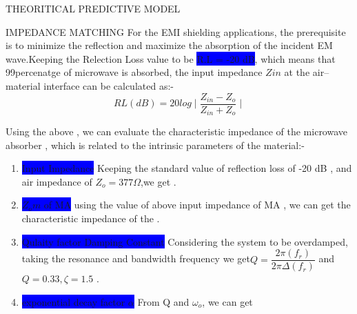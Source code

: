 \documentclass[11pt,aspect ratio=169]{beamer}
\begin{document}
\begin{frame}[t,allowframebreaks]{THEORITICAL PREDICTIVE MODEL}
	\begin{block}{IMPEDANCE MATCHING}
		For the EMI shielding applications, the prerequisite is to minimize the reflection and maximize the absorption of the incident EM wave.Keeping the Relection Loss value to be \colorbox{blue}{R.L = -20 dB}, which means that 99percenatge of microwave is absorbed, the input impedance $Zin$ at the air–material interface can be calculated as:-
		\begin{equation}
		RL(dB) = 20 log\mid{\dfrac{Z_{in}- Z_o}{Z_{in}+ Z_o}}\mid
		\end{equation}
		
		
		Using the above , we can evaluate the characteristic impedance of the microwave absorber , which is related to the intrinsic parameters of the material:-
		
	\end{block}
	\begin{enumerate}
		
		\item \colorbox{blue}{Input Impedance} Keeping the standard value of reflection loss of -20 dB , and air impedance of $Z_o = 377 \Omega $,we get .
		\item \colorbox{blue}{$Z_om$ of MA} using the value of above input impedance of MA , we can get the characteristic impedance of the  .
		
		\item \colorbox{blue}{Qulaity factor Damping Constant} Considering the system to be overdamped, taking the resonance and bandwidth frequency we get$ Q = \dfrac{2 \pi ( f_r)}{2 \pi \Delta(f_r)}$ and $Q=0.33 , \zeta=1.5$ .
		\item \colorbox{blue}{exponential decay factor $\alpha$} From Q and $\omega_o$, we can get  
		

\end{enumerate}
\end{frame}
\end{document}
